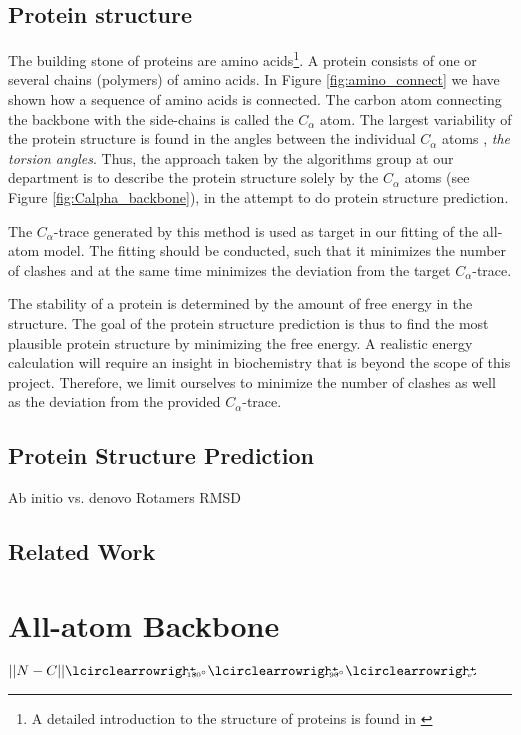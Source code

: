 \documentclass[10pt,a4paper,final,oneside,openany,article, twocolumn]{memoir}
\newcommand{\rotateAround}[1]{\lcirclearrowright \hspace{-3mm}\colorbox{white}{}{} \hspace{-1.7mm} _{\scriptscriptstyle #1}}
\begin{document}
\section{Protein structure}
The building stone of proteins are amino acids\footnote{A detailed
  introduction to the structure of proteins is found in
  \cite{branden}}. A protein consists of one or several chains
(polymers) of amino acids. In Figure \ref{fig:amino_connect} we have
shown how a sequence of amino acids is connected. The carbon atom
connecting the backbone with the side-chains is called the $C_\alpha$
atom. The largest variability of the protein structure is found in the
angles between the individual $C_\alpha$ atoms \cite{lotan04},
\textit{the torsion angles}. Thus, the approach taken by the
algorithms group at our department is to describe the protein
structure solely by the $C_\alpha$ atoms (see Figure
\ref{fig:Calpha_backbone}), in the attempt to do protein structure
prediction.	

The $C_\alpha$-trace generated by this method is used as target in our
fitting of the all-atom model. The fitting should be conducted, such
that it minimizes the number of clashes and at the same time minimizes
the deviation from the target $C_\alpha$-trace.

The stability of a protein is determined by the amount of free energy
in the structure. The goal of the protein structure prediction is thus
to find the most plausible protein structure by minimizing the free
energy. A realistic energy calculation will require an insight in
biochemistry that is beyond the scope of this project.  Therefore, we
limit ourselves to minimize the number of clashes as well as the
deviation from the provided $C_\alpha$-trace.

\section{Protein Structure Prediction}
Ab initio vs. denovo
Rotamers
RMSD


\section{Related Work}


\chapter{All-atom Backbone}

$||N - C|| \rotateAround{180^\circ} \rotateAround{90^\circ} \rotateAround{v}$
\end{document}

